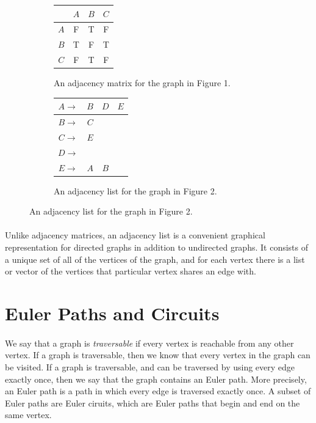 \documentclass{article}
\begin{document}
\begin{figure}[H]
\centering
\begin{subfigure}{.45\textwidth}
    \centering
    \begin{tabular}{|c|c|c|c|}
        \hline
         \cellcolor{black} & $A$ & $B$ & $C$\\
        \hline\hline
        $A$ & F & T & F\\
        \hline
        $B$ & T & F & T\\
        \hline
        $C$ & F & T & F\\
        \hline
    \end{tabular}
    \caption{An adjacency matrix for the graph in Figure 1.}
\end{subfigure}
\begin{subfigure}{.45\textwidth}
    \centering
    \begin{tabular}{|c||c|c|c|}
        \hline
        $A\rightarrow$ & $B$ & $D$ & $E$\\
        \hline
        $B\rightarrow$ & $C$ & & \\
        \hline
        $C\rightarrow$ & $E$ & &\\
        \hline
        $D\rightarrow$ & & &\\
        \hline
        $E\rightarrow$ & $A$ & $B$ &\\
        \hline
    \end{tabular}
    \caption{An adjacency list for the graph in Figure 2.}
\end{subfigure}
\end{figure}

\paragraph{}
Unlike adjacency matrices, an adjacency list is a convenient graphical representation for directed graphs in addition to undirected graphs. It consists of a unique set of all of the vertices of the graph, and for each vertex there is a list or vector of the vertices that particular vertex shares an edge with.

\section*{Euler Paths and Circuits}
\paragraph{}
We say that a graph is \textit{traversable} if every vertex is reachable from any other vertex. If a graph is traversable, then we know that every vertex in the graph can be visited. If a graph is traversable, and can be traversed by using every edge exactly once, then we say that the graph contains an Euler path. More precisely, an Euler path is a path in which every edge is traversed exactly once. A subset of Euler paths are Euler ciruits, which are Euler paths that begin and end on the same vertex.
\end{document}
